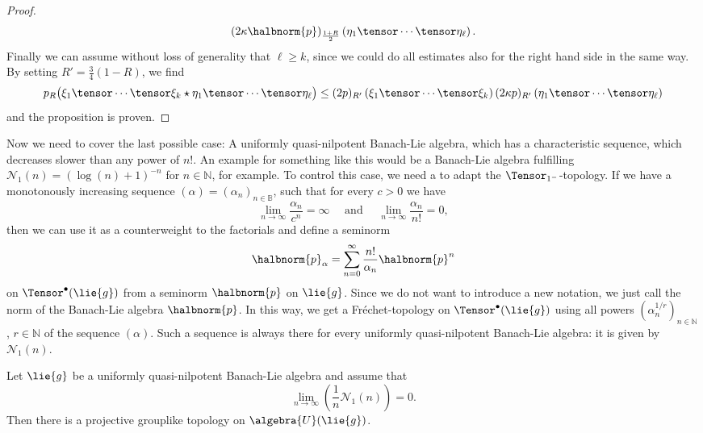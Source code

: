 \documentclass[
11pt,                          %
english                        %
]{article}
\begin{document}
\begin{proof}
\begin{align*}
		(2 \kappa \halbnorm{p})_{\frac{1 + R}{2}} 
		\left( \eta_1 \tensor \cdots \tensor \eta_\ell \right).
	\end{align*}
	Finally we can assume without loss of generality that $\ell \geq k$, since
	we could do all estimates also for the right hand side in the same way.
	By setting $R' = \frac{3}{4}(1-R)$, we find
	\begin{equation*}
		p_R \big(
			\xi_1 \tensor \cdots \tensor \xi_k
			\star
			\eta_1 \tensor \cdots \tensor \eta_\ell
		\big)
		\leq
		(2p)_{R'}
		\left( \xi_1 \tensor \cdots \tensor \xi_k \right)
		(2 \kappa p)_{R'}
		\left( \eta_1 \tensor \cdots \tensor \eta_\ell \right)
	\end{equation*}
	and the proposition is proven.
\end{proof}

Now we need to cover the last possible case: A uniformly quasi-nilpotent Banach-Lie 
algebra, which has a characteristic sequence, which decreases slower than any power 
of $n!$. An example for something like this would be a Banach-Lie algebra fulfilling 
$\mathcal{N}_1(n) = (\log(n) + 1)^{-n}$ for $n \in \mathbb{N}$, for example. To 
control this case, we need a to adapt the $\Tensor_{1^-}$-topology. If we have a 
monotonously increasing sequence $(\alpha) = (\alpha_n)_{n \in \mathbb{B}}$, such 
that for every $c > 0$ we have
\begin{equation}
	\lim\limits_{n \rightarrow \infty}
	\frac{\alpha_n}{c^n}
	=
	\infty
	\quad \text{ and } \quad
	\lim\limits_{n \rightarrow \infty}
	\frac{\alpha_n}{n!}
	=
	0,
\end{equation}
then we can use it as a counterweight to the factorials and define a seminorm
\begin{equation}
	\halbnorm{p}_\alpha
	=
	\sum\limits_{n=0}^\infty
	\frac{n!}{\alpha_n}
	\halbnorm{p}^n
\end{equation}
on $\Tensor^{\bullet}(\lie{g})$ from a seminorm $\halbnorm{p}$ on $\lie{g}$. Since 
we do not want to introduce a new notation, we just call the norm of the Banach-Lie 
algebra $\halbnorm{p}$. In this way, we get a Fr\'echet-topology on 
$\Tensor^{\bullet}(\lie{g})$ using all powers $(\alpha_n^{1/r})_{n \in \mathbb{N}}$, 
$r \in \mathbb{N}$ of the sequence $(\alpha)$. Such a sequence is always there for 
every uniformly quasi-nilpotent Banach-Lie algebra: it is given by 
$\mathcal{N}_1(n)$.
\begin{proposition}
	\label{prop:mainthm_rev_2}
	Let $\lie{g}$ be a uniformly quasi-nilpotent Banach-Lie algebra and assume that 
	\begin{equation*}
		\lim_{n \rightarrow \infty} 
		\left( \frac{1}{n}\mathcal{N}_1(n) \right)
		= 
		0.
	\end{equation*}
	Then there is a projective grouplike topology on $\algebra{U}(\lie{g})$.
\end{proposition}
\end{document}
